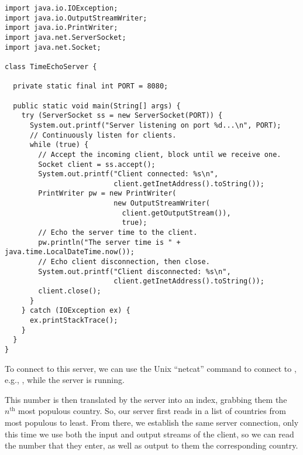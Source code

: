 \begin{lstlisting}[language=MyJava]
import java.io.IOException;
import java.io.OutputStreamWriter;
import java.io.PrintWriter;
import java.net.ServerSocket;
import java.net.Socket;

class TimeEchoServer {

  private static final int PORT = 8080;

  public static void main(String[] args) {
    try (ServerSocket ss = new ServerSocket(PORT)) {
      System.out.printf("Server listening on port %d...\n", PORT);
      // Continuously listen for clients.
      while (true) {
        // Accept the incoming client, block until we receive one.
        Socket client = ss.accept();
        System.out.printf("Client connected: %s\n", 
                          client.getInetAddress().toString());
        PrintWriter pw = new PrintWriter(
                          new OutputStreamWriter(
                            client.getOutputStream()), 
                            true);
        // Echo the server time to the client.
        pw.println("The server time is " + java.time.LocalDateTime.now());
        // Echo client disconnection, then close.
        System.out.printf("Client disconnected: %s\n", 
                          client.getInetAddress().toString());
        client.close();
      }
    } catch (IOException ex) { 
      ex.printStackTrace(); 
    }
  }
}
\end{lstlisting}

To connect to this server, we can use the Unix  ``netcat'' command to connect to , e.g., , while the server is running.

This number is then translated by the server into an index, grabbing them the~$n^{\text{th}}$ most populous country. 
So, our server first reads in a list of countries from most populous to least. 
From there, we establish the same server connection, only this time we use both the input and output streams of the client, so we can read the number that they enter, as well as output to them the corresponding country.

